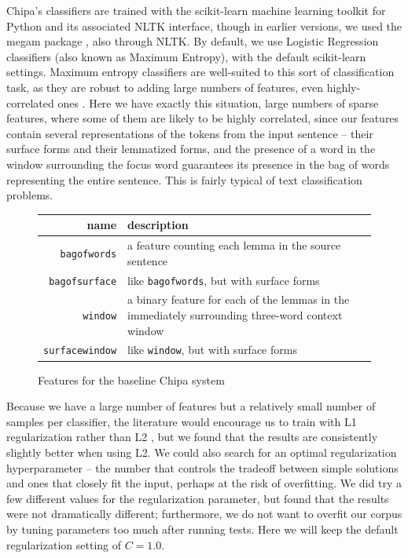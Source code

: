 Chipa's classifiers are trained with the scikit-learn machine learning toolkit
\cite{scikit-learn} for Python and its associated NLTK interface, though in
earlier versions, we used the megam package \cite{daume04cg-bfgs}, also through
NLTK. By default, we use Logistic Regression classifiers (also known as
Maximum Entropy), with the default scikit-learn settings.
Maximum entropy classifiers are well-suited to this sort of classification
task, as they are robust to adding large numbers of features, even
highly-correlated ones \cite{nigam1999using}. Here we have exactly this
situation, large numbers of sparse features, where some of them are likely to
be highly correlated, since our features contain several representations of the
tokens from the input sentence -- their surface forms and their lemmatized
forms, and the presence of a word in the window surrounding the focus word
guarantees its presence in the bag of words representing the entire sentence.
This is fairly typical of text classification problems.

\begin{figure}
  \begin{centering}
  \begin{tabular}{|r|p{11cm}|}
    \hline
    name          & description  \\
    \hline
    \texttt{bagofwords}    & a feature counting each lemma in the source sentence \\
    \hline
    \texttt{bagofsurface}  & like \texttt{bagofwords}, but with surface forms \\
    \hline
    \texttt{window}       & a binary feature for each of the lemmas in the immediately surrounding three-word context window \\
    \hline
    \texttt{surfacewindow} & like \texttt{window}, but with surface forms \\
    \hline
  \end{tabular}
  \end{centering}
  \caption{Features for the baseline Chipa system}
  \label{fig:baselinefeatures}
\end{figure}

Because we have a large number of features but a relatively small
number of samples per classifier, the literature would encourage us to train
with L1 regularization rather than L2 \cite{ng2004feature}, but we found that
the results are consistently slightly better when using L2. We could also
search for an optimal regularization hyperparameter -- the number that controls
the tradeoff between simple solutions and ones that closely fit the input,
perhaps at the risk of overfitting. We did try a few different values for the
regularization parameter, but found that the results were not dramatically
different; furthermore, we do not want to overfit our corpus by tuning
parameters too much after running tests. Here we will keep the default
regularization setting of $C=1.0$.

